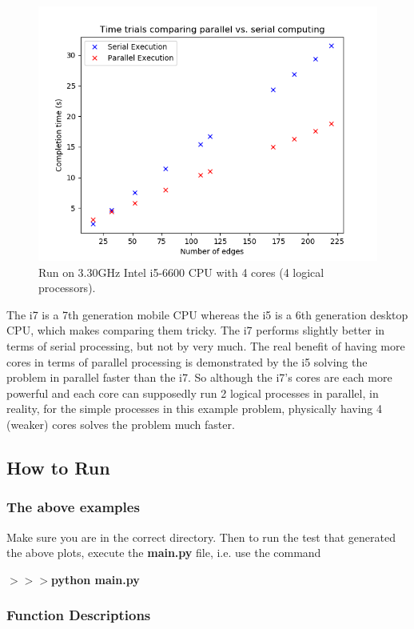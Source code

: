 \documentclass[12pt]{article}
\begin{document}
\begin{figure}[H]
	\includegraphics[scale=1]{Problem3-4cores.png}
	\caption{Run on 3.30GHz Intel i5-6600 CPU with 4 cores (4 logical processors).}
\end{figure}

The i7 is a 7th generation mobile CPU whereas the i5 is a 6th generation desktop CPU, which makes comparing them tricky. The i7 performs slightly better in terms of serial processing, but not by very much. The real benefit of having more cores in terms of parallel processing is demonstrated by the i5 solving the problem in parallel faster than the i7. So although the i7's cores are each more powerful and each core can supposedly run 2 logical processes in parallel, in reality, for the simple processes in this example problem, physically having 4 (weaker) cores solves the problem much faster.

\subsection*{How to Run}

\subsubsection*{The above examples}

Make sure you are in the correct directory. Then to run the test that generated the above plots, execute the \textbf{main.py} file, i.e. use the command

\noindent \textbf{$>>>$python main.py}

\subsubsection*{Function Descriptions}
\end{document}
